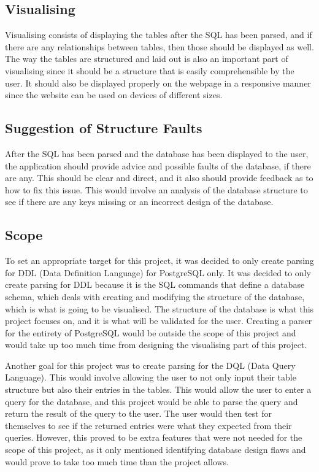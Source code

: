 \subsection{Visualising} 

Visualising consists of displaying the tables after the SQL has been parsed, and if there are any relationships between tables, then those should be displayed as well. The way the tables are structured and laid out is also an important part of visualising since it should be a structure that is easily comprehensible by the user. It should also be displayed properly on the webpage in a responsive manner since the website can be used on devices of different sizes.

\subsection{Suggestion of Structure Faults}

After the SQL has been parsed and the database has been displayed to the user, the application should provide advice and possible faults of the database, if there are any. This should be clear and direct, and it also should provide feedback as to how to fix this issue. This would involve an analysis of the database structure to see if there are any keys missing or an incorrect design of the database.

\subsection{Scope}

To set an appropriate target for this project, it was decided to only create parsing for DDL (Data Definition Language) for PostgreSQL only. It was decided to only create parsing for DDL because it is the SQL commands that define a database schema, which deals with creating and modifying the structure of the database, which is what is going to be visualised. The structure of the database is what this project focuses on, and it is what will be validated for the user. Creating a parser for the entirety of PostgreSQL would be outside the scope of this project and would take up too much time from designing the visualising part of this project.

Another goal for this project was to create parsing for the DQL (Data Query Language). This would involve allowing the user to not only input their table structure but also their entries in the tables. This would allow the user to enter a query for the database, and this project would be able to parse the query and return the result of the query to the user. The user would then test for themselves to see if the returned entries were what they expected from their queries. However, this proved to be extra features that were not needed for the scope of this project, as it only mentioned identifying database design flaws and would prove to take too much time than the project allows.

